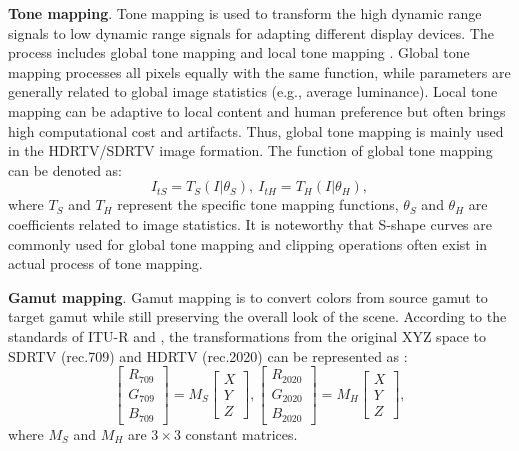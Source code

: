\documentclass[10pt,twocolumn,letterpaper]{article}
\begin{document}
\textbf{Tone mapping}. Tone mapping is used to transform the high dynamic range signals to low dynamic range signals for adapting different display devices. The process includes global tone mapping \cite{drago2003adaptive, reinhard2002parameter, tumblin1993tone} and local tone mapping \cite{larson1997visibility, lischinski2006interactive}. Global tone mapping processes all pixels equally with the same function, while parameters are generally related to global image statistics (e.g., average luminance). Local tone mapping can be adaptive to local content and human preference but often brings high computational cost and artifacts. Thus, global tone mapping is mainly used in the HDRTV/SDRTV image formation. The function of global tone mapping can be denoted as:
\begin{equation}
   I_{tS}=T_{S}(I|\theta_{S}),\ I_{tH}=T_{H}(I|\theta_{H}),
\end{equation}
where $T_{S}$ and $T_{H}$ represent the specific tone mapping functions, $ \theta_{S} $ and $ \theta_{H} $ are coefficients related to image statistics. It is noteworthy that S-shape curves are commonly used for global tone mapping and clipping operations often exist in actual process of tone mapping.

\textbf{Gamut mapping}. Gamut mapping is to convert colors from source gamut to target gamut while still preserving the overall look of the scene. According to the standards of ITU-R \cite{rec709} and \cite{rec2020}, the transformations from the original XYZ space to SDRTV (rec.709) and HDRTV (rec.2020) can be represented as :
\begin{equation}
  \begin{bmatrix}
      R_{709}\\ G_{709}\\ B_{709}
      \end{bmatrix}=M_{S}
      \begin{bmatrix}
         X \\ Y \\ Z
      \end{bmatrix}, 
    \begin{bmatrix}
      R_{2020}\\ G_{2020}\\ B_{2020}
      \end{bmatrix}=M_{H}
      \begin{bmatrix}
         X \\ Y \\ Z
      \end{bmatrix},
\end{equation}
where $M_{S}$ and $M_{H}$ are $3\times 3$ constant matrices. 
\end{document}
